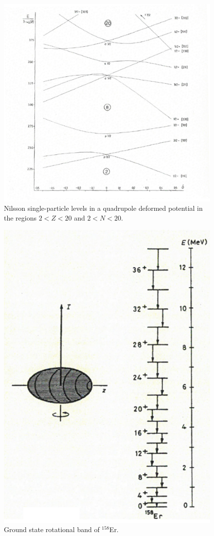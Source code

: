 \begin{figure}
	\centerline {
		\includegraphics*[width=15cm, angle=0.]{introduccion/figs/fig0_4_2_v4}
	}
	\caption{Nilsson single-particle levels in a quadrupole deformed potential in the regions $2<Z<20$ and $2<N<20$.}
	\label{fig0.4.1}
\end{figure}
\begin{figure}
	\centerline {
		\includegraphics*[width=12cm, angle=0.]{introduccion/figs/fig0_4_2_v3}
	}
	\caption{Ground state rotational band of $^{158}$Er.}
	\label{fig0.4.2}
\end{figure}

